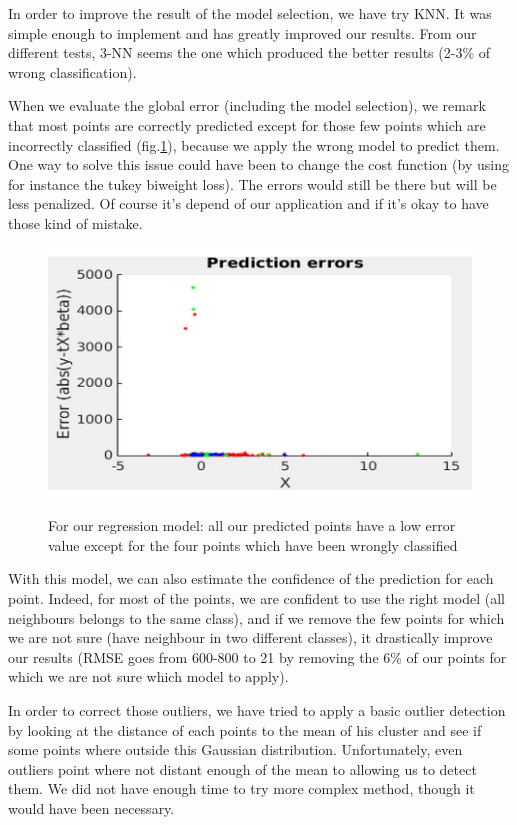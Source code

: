\documentclass{article} %
\begin{document}
In order to improve the result of the model selection, we have try KNN. It was simple enough to implement and has greatly improved our results. From our different tests, 3-NN seems the one which produced the better results (2-3\% of wrong classification).

When we evaluate the global error (including the model selection), we remark that most points are correctly predicted except for those few points which are incorrectly classified (fig.\ref{fig:predErrors}), because we apply the wrong model to predict them. One way to solve this issue could have been to change the cost function (by using for instance the tukey biweight loss). The errors would still be there but will be less penalized. Of course it’s depend of our application and if it’s okay to have those kind of mistake.

\begin{figure}[!h]
\center
{\includegraphics{figures/predErrors.png} \label{fig:predErrors}}
\caption{For our regression model: all our predicted points have a low error value except for the four points which have been wrongly classified}
\end{figure}

With this model, we can also estimate the confidence of the prediction for each point. Indeed, for most of the points, we are confident to use the right model (all neighbours belongs to the same class), and if we remove the few points for which we are not sure (have neighbour in two different classes), it drastically improve our results (RMSE goes from 600-800 to 21 by removing the 6\% of our points for which we are not sure which model to apply).

In order to correct those outliers, we have tried to apply a basic outlier detection by looking at the distance of each points to the mean of his cluster and see if some points where outside this Gaussian distribution. Unfortunately, even outliers point where not distant enough of the mean to allowing us to detect them. We did not have enough time to try more complex method, though it would have been necessary.
\end{document}
